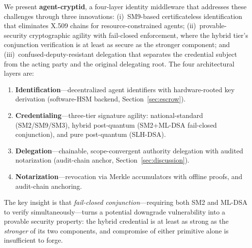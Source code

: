 \documentclass[10pt,twocolumn]{IEEEtran}
\begin{document}
We present \textbf{agent-cryptid}, a four-layer identity middleware that
addresses these challenges through three innovations: (i)~SM9-based
certificateless identification that eliminates X.509 chains for
resource-constrained agents; (ii)~provable-security cryptographic agility
with fail-closed enforcement, where the hybrid tier's conjunction
verification is at least as secure as the stronger component; and
(iii)~confused-deputy-resistant delegation that separates the credential
subject from the acting party and the original delegating root. The
four architectural layers are:

\begin{enumerate}
  \item \textbf{Identification}---decentralized agent identifiers with
    hardware-rooted key derivation (software-HSM backend, Section~\ref{sec:escrow}).
  \item \textbf{Credentialing}---three-tier signature agility:
    national-standard (SM2/SM9/SM3), hybrid post-quantum (SM2+ML-DSA
    fail-closed conjunction), and pure post-quantum (SLH-DSA).
  \item \textbf{Delegation}---chainable, scope-convergent authority
    delegation with audited notarization (audit-chain anchor,
    Section~\ref{sec:discussion}).
  \item \textbf{Notarization}---revocation via Merkle accumulators with
    offline proofs, and audit-chain anchoring.
\end{enumerate}

The key insight is that \emph{fail-closed conjunction}---requiring both
SM2 and ML-DSA to verify simultaneously---turns a potential downgrade
vulnerability into a provable security property: the hybrid credential is
at least as strong as the \emph{stronger} of its two components, and
compromise of either primitive alone is insufficient to forge.
\end{document}
